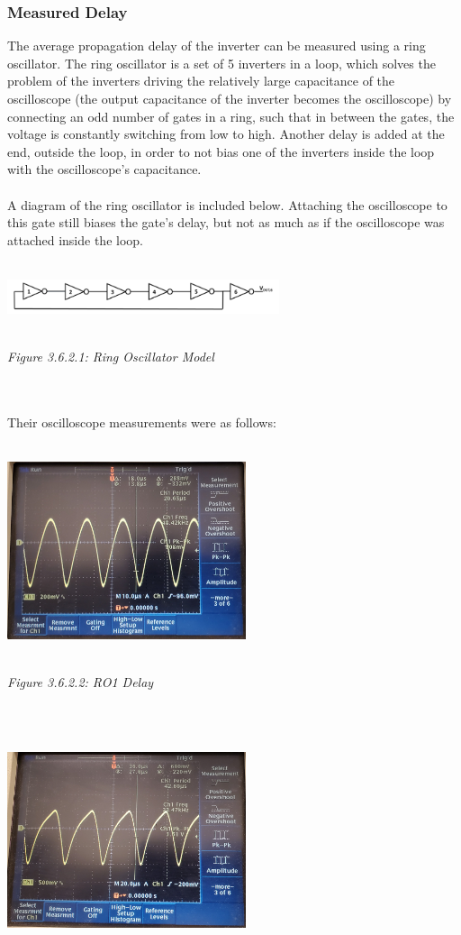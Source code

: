 \documentclass[12pt]{article}
\begin{document}
\subsubsection{Measured Delay}
The average propagation delay of the inverter can be measured using a ring oscillator. The ring oscillator is a set of 5 inverters in a loop, which solves the problem of the inverters driving the relatively large capacitance of the oscilloscope (the output capacitance of the inverter becomes the oscilloscope) by connecting an odd number of gates in a ring, such that in between the gates, the voltage is constantly switching from low to high. Another delay is added at the end, outside the loop, in order to not bias one of the inverters inside the loop with the oscilloscope's capacitance. 
\\
\\A diagram of the ring oscillator is included below. Attaching the oscilloscope to this gate still biases the gate's delay, but not as much as if the oscilloscope was attached inside the loop.
\\
\\\centerline{\includegraphics[width=8cm] {RO.PNG}}
\begin{center}
\\\emph{Figure 3.6.2.1: Ring Oscillator Model}
\end{center}
\\
\\Their oscilloscope measurements were as follows:
\\
\\\centerline{\includegraphics[width=7cm] {RO2.JPG}}
\begin{center}
\\\emph{Figure 3.6.2.2: RO1 Delay}
\end{center}
\\
\\\centerline{\includegraphics[width=7cm] {RO1.JPG}}
\end{document}
